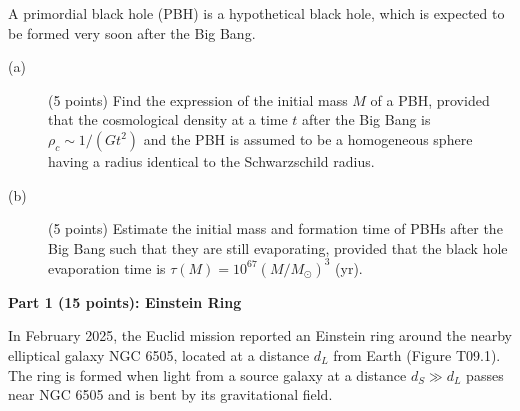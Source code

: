 A primordial black hole (PBH) is a hypothetical black hole, which is expected
to be formed very soon after the Big Bang.

\begin{description}
\item[(a)] (5 points) Find the expression of the initial mass $M$ of a PBH,
  provided that the cosmological density at a time $t$ after the Big Bang is
  $\rho_c \sim 1/(Gt^2)$ and the PBH is assumed to be a homogeneous sphere
  having a radius identical to the Schwarzschild radius.
\item[(b)] (5 points) Estimate the initial mass and formation time of PBHs
  after the Big Bang such that they are still evaporating, provided that the
  black hole evaporation time is
  $\tau(M) = 10^{67}\left(M/M_\odot\right)^3$ (yr).
\end{description}

\medskip\noindent\textbf{Part 1 (15 points): Einstein Ring}

In February 2025, the Euclid mission reported an Einstein ring around the
nearby elliptical galaxy NGC 6505, located at a distance $d_L$ from Earth
(Figure T09.1). The ring is formed when light from a source galaxy at a
distance $d_S \gg d_L$ passes near NGC 6505 and is bent by its gravitational
field.


